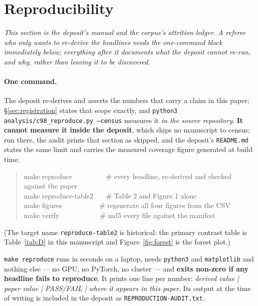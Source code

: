 \documentclass[10pt,letterpaper]{article}
\begin{document}
\section{Reproducibility}
\label{sec:repro}

\emph{This section is the deposit's manual and the corpus's attrition ledger. A referee who only
wants to re-derive the headlines needs the one-command block immediately below; everything after
it documents what the deposit cannot re-run, and why, rather than leaving it to be discovered.}

\paragraph{One command.}
The deposit re-derives and asserts the numbers that carry a claim in this paper;
\S\ref{sec:registration} states that scope exactly, and
\texttt{python3 analysis/c98\_reproduce.py --census} measures it \emph{in the source
repository}. \textbf{It cannot measure it inside the deposit}, which ships no manuscript to
census; run there, the audit prints that section as skipped, and the deposit's
\texttt{README.md} states the same limit and carries the measured coverage figure generated at
build time:

\begin{quote}\ttfamily\footnotesize
make reproduce \ \ \ \ \ \ \ \ \ \# every headline, re-derived and checked against the paper\\
make reproduce-table2 \ \ \ \# Table 2 and Figure 1 alone\\
make figures \ \ \ \ \ \ \ \ \ \ \# regenerate all four figures from the CSV\\
make verify \ \ \ \ \ \ \ \ \ \ \ \# md5 every file against the manifest
\end{quote}

(The target name \texttt{reproduce-table2} is historical: the primary contrast table is
Table~\ref{tab:D} in this manuscript and Figure~\ref{fig:forest} is the forest plot.)

\texttt{make reproduce} runs in seconds on a laptop, needs \texttt{python3} and
\texttt{matplotlib} and nothing else --- no GPU, no PyTorch, no cluster --- and \textbf{exits
non-zero if any headline fails to reproduce}. It prints one line per number: \emph{derived value |
paper value | PASS/FAIL | where it appears in this paper}. Its output at the time of writing is
included in the deposit as \texttt{REPRODUCTION-AUDIT.txt}.
\end{document}

